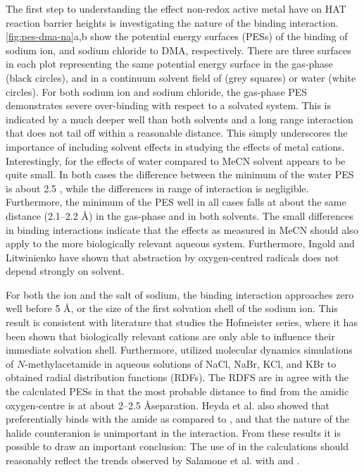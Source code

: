 The first step to understanding the effect non-redox active metal have on HAT reaction barrier heights is investigating the nature of the binding interaction. \ref{fig:pes-dma-na}a,b show the potential energy surfaces (PESs) of the binding of sodium ion, and sodium chloride to DMA, respectively. There are three surfaces in each plot representing the same potential energy surface in the gas-phase (black circles), and in a continuum solvent field of (grey squares) or water (white circles). For both sodium ion and sodium chloride, the gas-phase PES demonstrates severe over-binding with respect to a solvated system. This is indicated by a much deeper well than both solvents and a long range interaction that does not tail off within a reasonable distance. This simply underscores the importance of including solvent effects in studying the effects of metal cations. Interestingly, for the effects of water compared to MeCN solvent appears to be quite small. In both cases the difference between the minimum of the water PES is about 2.5 \kcalmol, while the differences in range of interaction is negligible. Furthermore, the minimum of the PES well in all cases falls at about the same distance (2.1--2.2 \AA) in the gas-phase and in both solvents. The small differences in binding interactions indicate that the effects as measured in MeCN should also apply to the more biologically relevant aqueous system. Furthermore, Ingold and Litwinienko have shown that  abstraction by oxygen-centred radicals does not depend strongly on solvent.\cite{Litwinienko2007}

For both the ion and the salt of sodium, the binding interaction approaches zero well before 5 \AA, or the size of the first solvation shell of the sodium ion.\cite{Degreve1996} This result is consistent with literature that studies the Hofmeister series, where it has been shown that biologically relevant cations are only able to influence their immediate solvation shell.\cite{Omta2003, Funkner2011} Furthermore, \citet{Heyda2009} utilized molecular dynamics simulations of $N$-methylacetamide in aqueous solutions of NaCl, NaBr, KCl, and KBr to obtained radial distribution functions (RDFs). The RDFS are in agree with the the calculated PESs in that the most probable distance to find  from the amidic oxygen-centre is at about 2--2.5 \AA separation. Heyda et al. also showed that  preferentially binds with the amide as compared to , and that the nature of the halide counteranion is unimportant in the interaction. From these results it is possible to draw an important conclusion: The use of  in the calculations should reasonably reflect the trends observed by Salamone et al. with  and .

